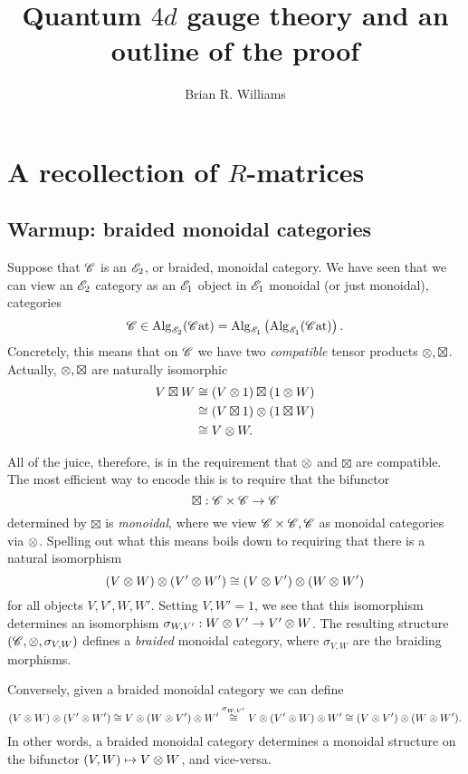 \documentclass[11pt]{amsart}
\title{Quantum $4d$ gauge theory and an outline of the proof}
\author{Brian R. Williams}
\date{}
\begin{document}
\maketitle

\section{A recollection of $R$-matrices}

\subsection{Warmup: braided monoidal categories}

Suppose that $\mathscr C$ is an $\mathscr E_2$, or braided, monoidal category.
We have seen that we can view an $\mathscr E_2$ category as an $\mathscr E_1$ object in $\mathscr E_1$ monoidal (or just monoidal), categories
\[
\mathscr C \in {\rm Alg}_{\mathscr E_2} (\mathscr C{\rm at}) = {\rm Alg}_{\mathscr E_1} \left({\rm Alg}_{\mathscr E_1} (\mathscr C{\rm at}) \right) .
\]
Concretely, this means that on $\mathscr C$ we have two {\em compatible} tensor products $\otimes, \boxtimes$.
Actually, $\otimes, \boxtimes$ are naturally isomorphic
\begin{align*}
V \boxtimes W & \cong (V \otimes 1) \boxtimes (1 \otimes W) \\ & \cong (V \boxtimes 1) \otimes (1 \boxtimes W) \\ & \cong V \otimes W .
\end{align*}

All of the juice, therefore, is in the requirement that $\otimes$ and $\boxtimes$ are compatible. 
The most efficient way to encode this is to require that the bifunctor
\[
\boxtimes : \mathscr C \times \mathscr C \to \mathscr C
\]
determined by $\boxtimes$ is {\em monoidal}, where we view $\mathscr C \times \mathscr C, \mathscr C$ as monoidal categories via $\otimes$. 
Spelling out what this means boils down to requiring that there is a natural isomorphism
\[
(V \otimes W) \otimes (V' \otimes W') \cong (V \otimes V') \otimes (W \otimes W')
\]
for all objects $V,V',W,W'$.
Setting $V, W'= 1$, we see that this isomorphism determines an isomorphism $\sigma_{W, V'} : W \otimes V' \to V' \otimes W$.
The resulting structure $(\mathscr C, \otimes, \sigma_{V,W})$ defines a {\em braided} monoidal category, where $\sigma_{V,W}$ are the braiding morphisms.

Conversely, given a braided monoidal category we can define
\[
(V \otimes W) \otimes (V' \otimes W') \cong V \otimes (W \otimes V') \otimes W'  \overset{\sigma_{W, V'}}{\cong} V \otimes (V' \otimes W) \otimes W' \cong (V \otimes V') \otimes (W \otimes W') .
\]
In other words, a braided monoidal category determines a monoidal structure on the bifunctor $(V,W) \mapsto V \otimes W$, and vice-versa. 
\end{document}
